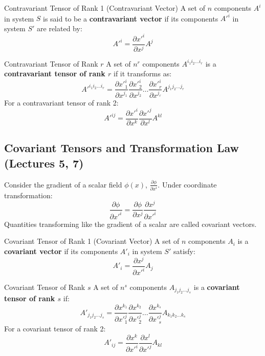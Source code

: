 \documentclass[11pt,a4paper]{article}
\begin{document}
\begin{definitionbox}{Contravariant Tensor of Rank 1 (Contravariant Vector)}
A set of $n$ components $A^i$ in system $S$ is said to be a \textbf{contravariant vector} if its components $A'^i$ in system $S'$ are related by:
\[
A'^i = \frac{\partial x'^i}{\partial x^j} A^j
\]
\end{definitionbox}

\begin{definitionbox}{Contravariant Tensor of Rank $r$}
A set of $n^r$ components $A^{i_1 i_2 \dots i_r}$ is a \textbf{contravariant tensor of rank $r$} if it transforms as:
\[
A'^{i_1 i_2 \dots i_r} = \frac{\partial x'^i_1}{\partial x^{j_1}} \frac{\partial x'^i_2}{\partial x^{j_2}} \dots \frac{\partial x'^i_r}{\partial x^{j_r}} A^{j_1 j_2 \dots j_r}
\]
For a contravariant tensor of rank 2:
\[
A'^{ij} = \frac{\partial x'^i}{\partial x^k} \frac{\partial x'^j}{\partial x^l} A^{kl}
\]
\end{definitionbox}

\subsection{Covariant Tensors and Transformation Law (Lectures 5, 7)}
Consider the gradient of a scalar field $\phi(x)$, $\frac{\partial \phi}{\partial x^i}$. Under coordinate transformation:
\[
\frac{\partial \phi}{\partial x'^i} = \frac{\partial \phi}{\partial x^j} \frac{\partial x^j}{\partial x'^i}
\]
Quantities transforming like the gradient of a scalar are called covariant vectors.

\begin{definitionbox}{Covariant Tensor of Rank 1 (Covariant Vector)}
A set of $n$ components $A_i$ is a \textbf{covariant vector} if its components $A'_i$ in system $S'$ satisfy:
\[
A'_i = \frac{\partial x^j}{\partial x'^i} A_j
\]
\end{definitionbox}

\begin{definitionbox}{Covariant Tensor of Rank $s$}
A set of $n^s$ components $A_{j_1 j_2 \dots j_s}$ is a \textbf{covariant tensor of rank $s$} if:
\[
A'_{j_1 j_2 \dots j_s} = \frac{\partial x^{k_1}}{\partial x'^j_1} \frac{\partial x^{k_2}}{\partial x'^j_2} \dots \frac{\partial x^{k_s}}{\partial x'^j_s} A_{k_1 k_2 \dots k_s}
\]
For a covariant tensor of rank 2:
\[
A'_{ij} = \frac{\partial x^k}{\partial x'^i} \frac{\partial x^l}{\partial x'^j} A_{kl}
\]
\end{definitionbox}
\end{document}
